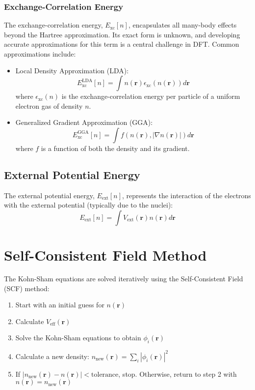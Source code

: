 \subsubsection{Exchange-Correlation Energy}
The exchange-correlation energy, $E_{\text{xc}}[n]$, encapsulates all many-body effects beyond the Hartree approximation. Its exact form is unknown, and developing accurate approximations for this term is a central challenge in DFT. Common approximations include:
\begin{itemize}
\item Local Density Approximation (LDA):
\begin{equation}
E_{\text{xc}}^{\text{LDA}}[n] = \int n(\mathbf{r})\epsilon_{\text{xc}}(n(\mathbf{r}))d\mathbf{r}
\end{equation}
where $\epsilon_{\text{xc}}(n)$ is the exchange-correlation energy per particle of a uniform electron gas of density $n$.
\item Generalized Gradient Approximation (GGA):
\begin{equation}
E_{\text{xc}}^{\text{GGA}}[n] = \int f(n(\mathbf{r}), |\nabla n(\mathbf{r})|)d\mathbf{r}
\end{equation}
where $f$ is a function of both the density and its gradient.
\end{itemize}
\subsection{External Potential Energy}
The external potential energy, $E_{\text{ext}}[n]$, represents the interaction of the electrons with the external potential (typically due to the nuclei):
\begin{equation}
E_{\text{ext}}[n] = \int V_{\text{ext}}(\mathbf{r})n(\mathbf{r})d\mathbf{r}
\end{equation}
\section{Self-Consistent Field Method}
The Kohn-Sham equations are solved iteratively using the Self-Consistent Field (SCF) method:
\begin{enumerate}
\item Start with an initial guess for $n(\mathbf{r})$
\item Calculate $V_{\text{eff}}(\mathbf{r})$
\item Solve the Kohn-Sham equations to obtain $\phi_i(\mathbf{r})$
\item Calculate a new density: $n_{\text{new}}(\mathbf{r}) = \sum_i |\phi_i(\mathbf{r})|^2$
\item If $|n_{\text{new}}(\mathbf{r}) - n(\mathbf{r})| < \text{tolerance}$, stop. Otherwise, return to step 2 with $n(\mathbf{r}) = n_{\text{new}}(\mathbf{r})$
\end{enumerate}
